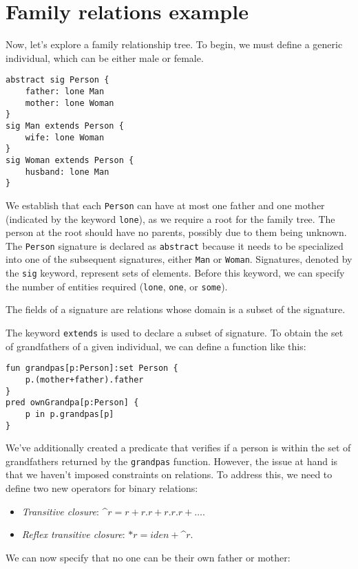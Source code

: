 \section{Family relations example}

Now, let's explore a family relationship tree. 
To begin, we must define a generic individual, which can be either male or female.        
\begin{lstlisting}[language=alloy]
abstract sig Person {
    father: lone Man
    mother: lone Woman
}
sig Man extends Person {
    wife: lone Woman
}
sig Woman extends Person {
    husband: lone Man
}
\end{lstlisting}
We establish that each \texttt{Person} can have at most one father and one mother (indicated by the keyword \texttt{lone}), as we require a root for the family tree. 
The person at the root should have no parents, possibly due to them being unknown. 
The \texttt{Person} signature is declared as \texttt{abstract} because it needs to be specialized into one of the subsequent signatures, either \texttt{Man} or \texttt{Woman}. 
Signatures, denoted by the \texttt{sig} keyword, represent sets of elements. 
Before this keyword, we can specify the number of entities required (\texttt{lone}, \texttt{one}, or \texttt{some}).
\begin{definition}
    The fields of a signature are relations whose domain is a subset of the signature. 
\end{definition}  
The keyword \texttt{extends} is used to declare a subset of signature. 
To obtain the set of grandfathers of a given individual, we can define a function like this:
\begin{lstlisting}[language=alloy]
fun grandpas[p:Person]:set Person {
    p.(mother+father).father
}
pred ownGrandpa[p:Person] {
    p in p.grandpas[p]
}
\end{lstlisting}
We've additionally created a predicate that verifies if a person is within the set of grandfathers returned by the \texttt{grandpas} function. 
However, the issue at hand is that we haven't imposed constraints on relations. 
To address this, we need to define two new operators for binary relations:
\begin{itemize}
    \item \textit{Transitive closure}: \textasciicircum $r=r+r.r+r.r.r+\dots$.
    \item \textit{Reflex transitive closure}: $*r=iden+$\textasciicircum$r$.
\end{itemize}
We can now specify that no one can be their own father or mother:
